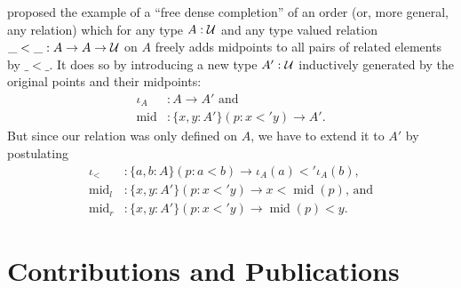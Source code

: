 \begin{example}
\citet{nordvallinductive} proposed the example of a ``free dense completion'' of
an order (or, more general, any relation) which for any type $A : \mathcal{U}$ and
any type valued relation $\_<\_ : A \to A \to \mathcal{U}$ on $A$ freely adds midpoints
to all pairs of related elements by $\_<\_$.
It does so by introducing a new type $A' : \mathcal{U}$ inductively generated by the
original points and their midpoints:
\begin{align*}
\iota_A		&: A \to A' \text{ and} \\
\mathop{mid}	&: \{x, y : A'\}(p : x <' y) \to A' \text{.}
\end{align*}
But since our relation was only defined on $A$, we have to extend it to $A'$ by
postulating
\begin{align*}
\iota_<		&: \{a, b : A\}(p : a < b) \to \iota_A(a) <' \iota_A(b) \text{,} \\
\mathop{mid}_l	&: \{x, y : A'\}(p : x <' y) \to x < \mathop{mid}(p) \text{, and} \\
\mathop{mid}_r	&: \{x, y : A'\}(p : x <' y) \to \mathop{mid}(p) < y \text{.}
\end{align*}
\end{example}

\section{Contributions and Publications}

